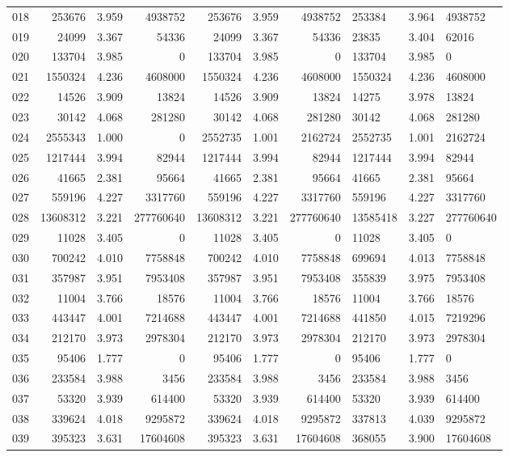 \begin{longtable}{crrrrrr}
018 & 253676 & 3.959 & 4938752 & 253676 & 3.959 & 4938752 & 253384 & 3.964 & 4938752 \\
019 & 24099 & 3.367 & 54336 & 24099 & 3.367 & 54336 & 23835 & 3.404 & 62016 \\
020 & 133704 & 3.985 & 0 & 133704 & 3.985 & 0 & 133704 & 3.985 & 0 \\
021 & 1550324 & 4.236 & 4608000 & 1550324 & 4.236 & 4608000 & 1550324 & 4.236 & 4608000 \\
022 & 14526 & 3.909 & 13824 & 14526 & 3.909 & 13824 & 14275 & 3.978 & 13824 \\
023 & 30142 & 4.068 & 281280 & 30142 & 4.068 & 281280 & 30142 & 4.068 & 281280 \\
024 & 2555343 & 1.000 & 0 & 2552735 & 1.001 & 2162724 & 2552735 & 1.001 & 2162724 \\
025 & 1217444 & 3.994 & 82944 & 1217444 & 3.994 & 82944 & 1217444 & 3.994 & 82944 \\
026 & 41665 & 2.381 & 95664 & 41665 & 2.381 & 95664 & 41665 & 2.381 & 95664 \\
027 & 559196 & 4.227 & 3317760 & 559196 & 4.227 & 3317760 & 559196 & 4.227 & 3317760 \\
028 & 13608312 & 3.221 & 277760640 & 13608312 & 3.221 & 277760640 & 13585418 & 3.227 & 277760640 \\
029 & 11028 & 3.405 & 0 & 11028 & 3.405 & 0 & 11028 & 3.405 & 0 \\
030 & 700242 & 4.010 & 7758848 & 700242 & 4.010 & 7758848 & 699694 & 4.013 & 7758848 \\
031 & 357987 & 3.951 & 7953408 & 357987 & 3.951 & 7953408 & 355839 & 3.975 & 7953408 \\
032 & 11004 & 3.766 & 18576 & 11004 & 3.766 & 18576 & 11004 & 3.766 & 18576 \\
033 & 443447 & 4.001 & 7214688 & 443447 & 4.001 & 7214688 & 441850 & 4.015 & 7219296 \\
034 & 212170 & 3.973 & 2978304 & 212170 & 3.973 & 2978304 & 212170 & 3.973 & 2978304 \\
035 & 95406 & 1.777 & 0 & 95406 & 1.777 & 0 & 95406 & 1.777 & 0 \\
036 & 233584 & 3.988 & 3456 & 233584 & 3.988 & 3456 & 233584 & 3.988 & 3456 \\
037 & 53320 & 3.939 & 614400 & 53320 & 3.939 & 614400 & 53320 & 3.939 & 614400 \\
038 & 339624 & 4.018 & 9295872 & 339624 & 4.018 & 9295872 & 337813 & 4.039 & 9295872 \\
039 & 395323 & 3.631 & 17604608 & 395323 & 3.631 & 17604608 & 368055 & 3.900 & 17604608 \\

\end{longtable}
